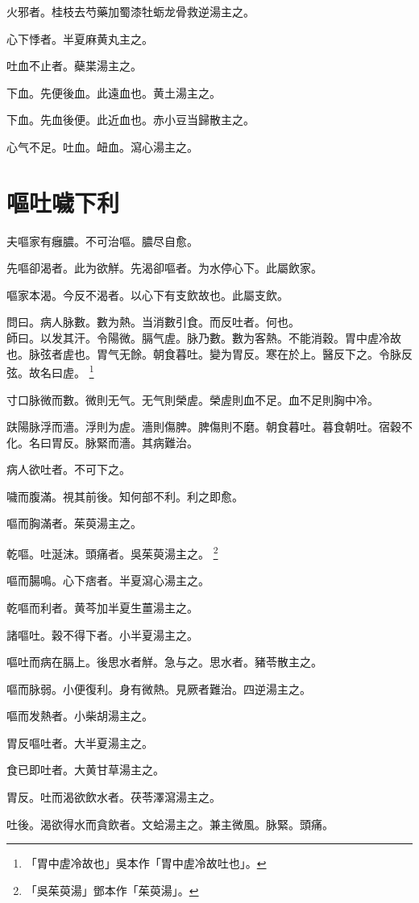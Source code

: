 \documentclass[12pt,twoside,UTF8,b5paper]{ctexbook}
\begin{document}
火邪者。桂枝去芍藥加蜀漆牡蛎龙骨救逆湯主之。

心下悸者。半夏麻黄丸主之。

吐血不止者。蘗枼湯主之。

下血。先便後血。此遠血也。黄土湯主之。

下血。先血後便。此近血也。赤小豆当歸散主之。

心气不足。吐血。衄血。瀉心湯主之。

\chapter{嘔吐噦下利}

夫嘔家有癰膿。不可治嘔。膿尽自愈。

先嘔卻渴者。此为欲觧。先渴卻嘔者。为水停心下。此屬飲家。

嘔家本渴。今反不渴者。以心下有支飲故也。此屬支飲。

問曰。病人脉數。數为熱。当消數引食。而反吐者。何也。\\
師曰。以发其汗。令陽微。膈气虗。脉乃數。數为客熱。不能消穀。胃中虗冷故也。脉弦者虗也。胃气无餘。朝食暮吐。變为胃反。寒在於上。醫反下之。令脉反弦。故名曰虗。
	\footnote{「胃中虗冷故也」吳本作「胃中虗冷故吐也」。}

寸口脉微而數。微則无气。无气則榮虗。榮虗則血不足。血不足則胸中冷。

趺陽脉浮而濇。浮則为虗。濇則傷脾。脾傷則不磨。朝食暮吐。暮食朝吐。宿穀不化。名曰胃反。脉緊而濇。其病難治。

病人欲吐者。不可下之。

噦而腹滿。視其前後。知何部不利。利之即愈。

嘔而胸滿者。茱萸湯主之。

乾嘔。吐涎沫。頭痛者。吳茱萸湯主之。
	\footnote{「吳茱萸湯」鄧本作「茱萸湯」。}

嘔而腸鳴。心下痞者。半夏瀉心湯主之。

乾嘔而利者。黄芩加半夏生薑湯主之。

諸嘔吐。穀不得下者。小半夏湯主之。

嘔吐而病在膈上。後思水者觧。急与之。思水者。豬苓散主之。

嘔而脉弱。小便復利。身有微熱。見厥者難治。四逆湯主之。

嘔而发熱者。小柴胡湯主之。

胃反嘔吐者。大半夏湯主之。

食已即吐者。大黄甘草湯主之。

胃反。吐而渴欲飲水者。茯苓澤瀉湯主之。

吐後。渴欲得水而貪飲者。文蛤湯主之。兼主微風。脉緊。頭痛。
\end{document}
